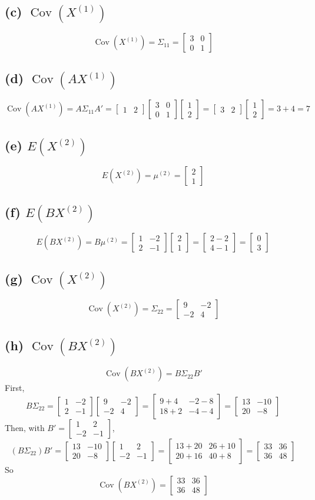 \documentclass[11pt]{article}
\newcommand{\mat}[1]{\begin{bmatrix} #1 \end{bmatrix}}
\begin{document}
\subsection*{(c) $\operatorname{Cov}(X^{(1)})$}
\[
\operatorname{Cov}(X^{(1)}) = \Sigma_{11} = \mat{3&0\\0&1}
\]

\subsection*{(d) $\operatorname{Cov}(AX^{(1)})$}
\[
\operatorname{Cov}(AX^{(1)}) = A\Sigma_{11}A' = \mat{1&2}\mat{3&0\\0&1}\mat{1\\2}
= \mat{3 & 2}\mat{1\\2} = 3+4 = 7
\]

\subsection*{(e) $E(X^{(2)})$}
\[
E(X^{(2)}) = \mu^{(2)} = \mat{2\\1}
\]

\subsection*{(f) $E(BX^{(2)})$}
\[
E(BX^{(2)}) = B\mu^{(2)} = \mat{1&-2\\2&-1}\mat{2\\1} = \mat{2-2\\4-1} = \mat{0\\3}
\]

\subsection*{(g) $\operatorname{Cov}(X^{(2)})$}
\[
\operatorname{Cov}(X^{(2)}) = \Sigma_{22} = \mat{9&-2\\-2&4}
\]

\subsection*{(h) $\operatorname{Cov}(BX^{(2)})$}
\[
\operatorname{Cov}(BX^{(2)}) = B\Sigma_{22}B'
\]
First,
\[
B\Sigma_{22} = \mat{1&-2\\2&-1}\mat{9&-2\\-2&4} = \mat{9+4 & -2-8\\18+2 & -4-4} = \mat{13&-10\\20&-8}
\]
Then, with $B' = \mat{1&2\\-2&-1}$,
\[
(B\Sigma_{22})B' = \mat{13&-10\\20&-8}\mat{1&2\\-2&-1}
= \mat{13+20 & 26+10\\ 20+16 & 40+8} = \mat{33&36\\36&48}
\]
So
\[
\operatorname{Cov}(BX^{(2)}) = \mat{33&36\\36&48}
\]
\end{document}

